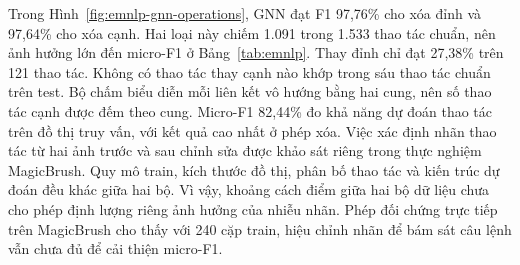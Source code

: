 Trong Hình~\ref{fig:emnlp-gnn-operations}, GNN đạt F1 97,76\% cho xóa đỉnh và 97,64\% cho xóa cạnh.
Hai loại này chiếm 1.091 trong 1.533 thao tác chuẩn, nên ảnh hưởng lớn đến
micro-F1 ở Bảng~\ref{tab:emnlp}. Thay đỉnh chỉ đạt 27,38\% trên 121 thao
tác. Không có thao tác thay cạnh nào khớp trong sáu thao tác chuẩn trên test. Bộ chấm biểu diễn mỗi liên kết vô hướng bằng hai cung, nên số thao tác cạnh được đếm theo cung.
Micro-F1 82,44\% đo khả năng dự đoán thao tác trên đồ thị truy vấn,
với kết quả cao nhất ở phép xóa. Việc xác định nhãn thao tác từ hai ảnh
trước và sau chỉnh sửa được khảo sát riêng trong thực nghiệm MagicBrush.
Quy mô train, kích thước đồ thị, phân bố thao tác và kiến trúc dự đoán
đều khác giữa hai bộ. Vì vậy, khoảng cách điểm giữa hai bộ dữ liệu
chưa cho phép định lượng riêng ảnh hưởng của nhiễu nhãn.
Phép đối chứng trực tiếp trên MagicBrush cho thấy với 240 cặp train, hiệu
chỉnh nhãn để bám sát câu lệnh vẫn chưa đủ để cải thiện micro-F1.
\FloatBarrier
